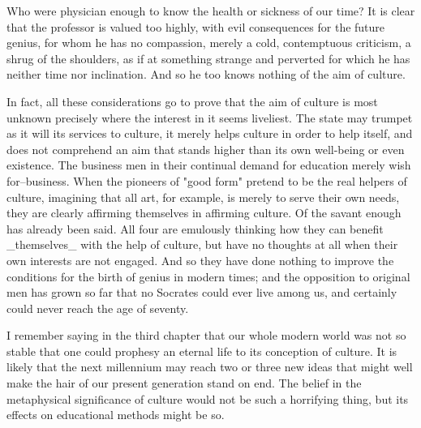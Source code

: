 Who were physician enough to know the health or sickness of our time?
It is clear that the professor is valued too highly, with evil
consequences for the future genius, for whom he has no compassion,
merely a cold, contemptuous criticism, a shrug of the shoulders, as
if at something strange and perverted for which he has neither time
nor inclination. And so he too knows nothing of the aim of culture.

In fact, all these considerations go to prove that the aim of culture
is most unknown precisely where the interest in it seems liveliest.
The state may trumpet as it will its services to culture, it merely
helps culture in order to help itself, and does not comprehend an aim
that stands higher than its own well-being or even existence. The
business men in their continual demand for education merely wish
for--business. When the pioneers of "good form" pretend to be the
real helpers of culture, imagining that all art, for example, is
merely to serve their own needs, they are clearly affirming
themselves in affirming culture. Of the savant enough has already
been said. All four are emulously thinking how they can benefit
_themselves_ with the help of culture, but have no thoughts at all
when their own interests are not engaged. And so they have done
nothing to improve the conditions for the birth of genius in modern
times; and the opposition to original men has grown so far that no
Socrates could ever live among us, and certainly could never reach
the age of seventy.

I remember saying in the third chapter that our whole modern world
was not so stable that one could prophesy an eternal life to its
conception of culture. It is likely that the next millennium may
reach two or three new ideas that might well make the hair of our
present generation stand on end. The belief in the metaphysical
significance of culture would not be such a horrifying thing, but its
effects on educational methods might be so.

